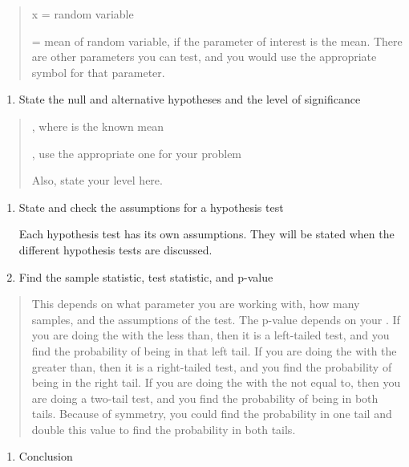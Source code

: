 \documentclass[]{book}
\providecommand{\tightlist}{%
  \setlength{\itemsep}{0pt}\setlength{\parskip}{0pt}}
\begin{document}
\begin{quote}
x = random variable

= mean of random variable, if the parameter of interest is the mean.
There are other parameters you can test, and you would use the
appropriate symbol for that parameter.
\end{quote}

\begin{enumerate}
\def\labelenumi{\arabic{enumi}.}
\setcounter{enumi}{1}
\tightlist
\item
  State the null and alternative hypotheses and the level of
  significance
\end{enumerate}

\begin{quote}
, where is the known mean

, use the appropriate one for your problem

Also, state your level here.
\end{quote}

\begin{enumerate}
\def\labelenumi{\arabic{enumi}.}
\setcounter{enumi}{2}
\item
  State and check the assumptions for a hypothesis test

  Each hypothesis test has its own assumptions. They will be stated
  when the different hypothesis tests are discussed.
\item
  Find the sample statistic, test statistic, and p-value
\end{enumerate}

\begin{quote}
This depends on what parameter you are working with, how many samples,
and the assumptions of the test. The p-value depends on your . If you
are doing the with the less than, then it is a left-tailed test, and
you find the probability of being in that left tail. If you are doing
the with the greater than, then it is a right-tailed test, and you
find the probability of being in the right tail. If you are doing the
with the not equal to, then you are doing a two-tail test, and you
find the probability of being in both tails. Because of symmetry, you
could find the probability in one tail and double this value to find
the probability in both tails.
\end{quote}

\begin{enumerate}
\def\labelenumi{\arabic{enumi}.}
\setcounter{enumi}{4}
\tightlist
\item
  Conclusion
\end{enumerate}
\end{document}
